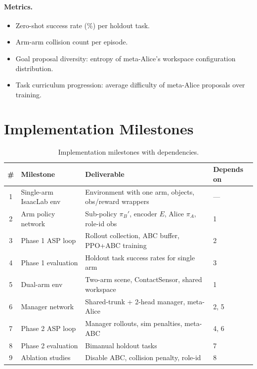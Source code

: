 \documentclass[12pt, a4paper]{article}
\newcommand{\piA}{\pi_A}
\newcommand{\piB}{\pi_B}
\newcommand{\Enc}{E}
\begin{document}
\paragraph{Metrics.}
\begin{itemize}[nosep]
    \item Zero-shot success rate (\%) per holdout task.
    \item Arm-arm collision count per episode.
    \item Goal proposal diversity: entropy of meta-Alice's workspace configuration distribution.
    \item Task curriculum progression: average difficulty of meta-Alice proposals over training.
\end{itemize}

\section{Implementation Milestones}
\label{sec:milestones}

\begin{table}[h!]
\centering
\caption{Implementation milestones with dependencies.}
\begin{tabularx}{\textwidth}{clXl}
\toprule
\# & Milestone & Deliverable & Depends on \\
\midrule
1 & Single-arm IsaacLab env & Environment with one arm, objects, obs/reward wrappers & --- \\
2 & Arm policy network & Sub-policy $\piB'$, encoder $\Enc$, Alice $\piA$, role-id obs & 1 \\
3 & Phase 1 ASP loop & Rollout collection, ABC buffer, PPO+ABC training & 2 \\
4 & Phase 1 evaluation & Holdout task success rates for single arm & 3 \\
5 & Dual-arm env & Two-arm scene, ContactSensor, shared workspace & 1 \\
6 & Manager network & Shared-trunk + 2-head manager, meta-Alice & 2, 5 \\
7 & Phase 2 ASP loop & Manager rollouts, sim penalties, meta-ABC & 4, 6 \\
8 & Phase 2 evaluation & Bimanual holdout tasks & 7 \\
9 & Ablation studies & Disable ABC, collision penalty, role-id & 8 \\
\bottomrule
\end{tabularx}
\label{tab:milestones}
\end{table}
\end{document}
